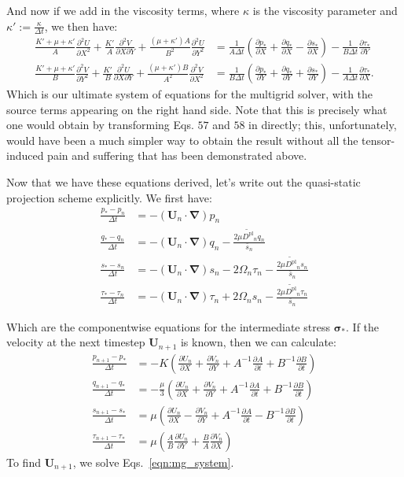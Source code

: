 \documentclass[11pt]{article}
\newcommand{\p}{\partial}
\newcommand{\bsig}{\boldsymbol\sigma}
\newcommand{\bU}{\mathbf{U}}
\newcommand{\Dpl}{D^\text{pl}}
\newcommand{\bgrad}{\boldsymbol{\nabla}}
\newcommand{\advn}{\left(\bU_n\cdot\bgrad\right)}
\begin{document}
And now if we add in the viscosity terms, where $\kappa$ is the viscosity parameter and $\kappa' := \frac{\kappa}{\Delta t}$, we then have:
\begin{align}
    \frac{K' + \mu + \kappa'}{A}\frac{\p^2 U}{\p X^2} + \frac{K'}{A}\frac{\p^2 V}{\p X\p Y} + \frac{(\mu + \kappa') A}{B^2}\frac{\p^2 U}{\p Y^2} &= \frac{1}{A\Delta t}\left(\frac{\p p_*}{\p X} + \frac{\p q_*}{\p X} - \frac{\p s_*}{\p X}\right) - \frac{1}{B\Delta t}\frac{\p \tau_*}{\p Y}\\
    \frac{K' + \mu + \kappa'}{B}\frac{\p^2 V}{\p Y^2} + \frac{K'}{B}\frac{\p^2 U}{\p X\p Y} + \frac{(\mu + \kappa') B}{A^2}\frac{\p^2 V}{\p X^2} &= \frac{1}{B\Delta t}\left(\frac{\p p_*}{\p Y} + \frac{\p q_*}{\p Y} + \frac{\p s_*}{\p Y}\right) - \frac{1}{A\Delta t}\frac{\p \tau_*}{\p X}.
    \label{eqn:mg_system}
\end{align}
Which is our ultimate system of equations for the multigrid solver, with the source terms appearing on the right hand side. Note that this is precisely what one would obtain by transforming Eqs. $57$ and $58$ in \cite{rycroft15} directly; this, unfortunately, would have been a much simpler way to obtain the result without all the tensor-induced pain and suffering that has been demonstrated above.

Now that we have these equations derived, let's write out the quasi-static projection scheme explicitly. We first have:
\begin{align}
    \frac{p_* - p_n}{\Delta t} &= -\advn p_n\\
    \frac{q_* - q_n}{\Delta t} &= -\advn q_n - \frac{2\mu\widetilde{\Dpl}_nq_n}{\bar{s}_n}\\
    \frac{s_* - s_n}{\Delta t} &= -\advn s_n - 2\Omega_n\tau_n - \frac{2\mu\widetilde{\Dpl}_ns_n}{\bar{s}_n}\\
    \frac{\tau_* - \tau_n}{\Delta t} &= -\advn \tau_n + 2\Omega_n s_n - \frac{2\mu\widetilde{\Dpl}_n\tau_n}{\bar{s}_n}
    \label{eqn:adv_step}
\end{align}

Which are the componentwise equations for the intermediate stress $\bsig_*$. If the velocity at the next timestep $\bU_{n+1}$ is known, then we can calculate:
\begin{align}
    \frac{p_{n+1}-p_*}{\Delta t} &= -K\left(\frac{\p U_n}{\p X} + \frac{\p V_n}{\p Y} + A^{-1}\frac{\p A}{\p t} + B^{-1}\frac{\p B}{\p t}\right)\\
    \frac{q_{n+1}-q_*}{\Delta t} &= -\frac{\mu}{3}\left(\frac{\p U_n}{\p X} + \frac{\p V_n}{\p Y} + A^{-1}\frac{\p A}{\p t} + B^{-1}\frac{\p B}{\p t}\right)\\
    \frac{s_{n+1}-s_*}{\Delta t} &= \mu\left(\frac{\p U_n}{\p X} - \frac{\p V_n}{\p Y} + A^{-1}\frac{\p A}{\p t} - B^{-1}\frac{\p B}{\p t}\right)\\
    \frac{\tau_{n+1}-\tau_*}{\Delta t} &= \mu\left(\frac{A}{B}\frac{\p U_n}{\p Y} + \frac{B}{A}\frac{\p V_n}{\p X} \right)
    \label{eqn:proj_step}
\end{align}
To find $\bU_{n+1}$, we solve Eqs.~\ref{eqn:mg_system}.
\end{document}
